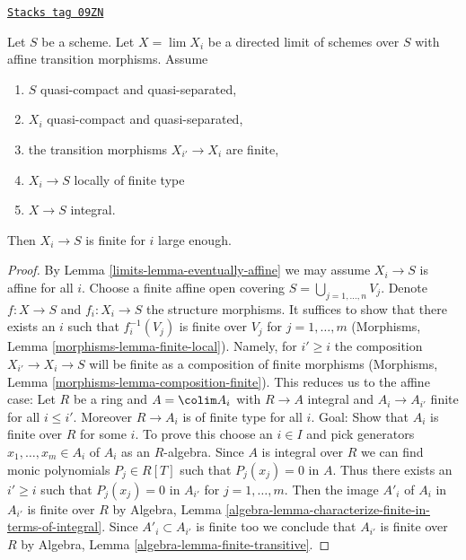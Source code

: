 \begin{lemma}
\label{limits-lemma-eventually-finite}
\href{https://stacks.math.columbia.edu/tag/09ZN}{\texttt{Stacks tag 09ZN}}

Let $S$ be a scheme. Let $X = \lim X_i$ be a directed limit of schemes
over $S$ with affine transition morphisms. Assume
\begin{enumerate}
\item $S$ quasi-compact and quasi-separated,
\item $X_i$ quasi-compact and quasi-separated,
\item the transition morphisms $X_{i'} \to X_i$ are finite,
\item $X_i \to S$ locally of finite type
\item $X \to S$ integral.
\end{enumerate}
Then $X_i \to S$ is finite for $i$ large enough.
\end{lemma}

\begin{proof}

By Lemma \ref{limits-lemma-eventually-affine}
we may assume $X_i \to S$ is affine for all $i$.
Choose a finite affine open covering $S = \bigcup_{j = 1, \ldots, n} V_j$.
Denote $f : X \to S$ and $f_i : X_i \to S$ the structure morphisms.
It suffices to show that there exists an $i$ such that
$f_i^{-1}(V_j)$ is finite over $V_j$ for $j = 1, \ldots, m$
(Morphisms, Lemma \ref{morphisms-lemma-finite-local}).
Namely, for $i' \geq i$ the composition $X_{i'} \to X_i \to S$
will be finite as a composition of finite morphisms
(Morphisms, Lemma \ref{morphisms-lemma-composition-finite}).
This reduces us to the affine case: Let $R$ be a ring and
$A = \colim A_i$ with $R \to A$ integral and $A_i \to A_{i'}$
finite for all $i \leq i'$. Moreover $R \to A_i$ is of finite type
for all $i$. Goal: Show that $A_i$ is finite over $R$ for some $i$.
To prove this choose an $i \in I$ and pick generators
$x_1, \ldots, x_m \in A_i$ of $A_i$ as an $R$-algebra.
Since $A$ is integral over $R$ we can find monic polynomials
$P_j \in R[T]$ such that $P_j(x_j) = 0$ in $A$.
Thus there exists an $i' \geq i$ such that $P_j(x_j) = 0$ in $A_{i'}$
for $j = 1, \ldots, m$. Then the image $A'_i$ of $A_i$ in $A_{i'}$
is finite over $R$ by
Algebra, Lemma \ref{algebra-lemma-characterize-finite-in-terms-of-integral}.
Since $A'_i \subset A_{i'}$ is finite too we conclude
that $A_{i'}$ is finite over $R$ by
Algebra, Lemma \ref{algebra-lemma-finite-transitive}.
\end{proof}

